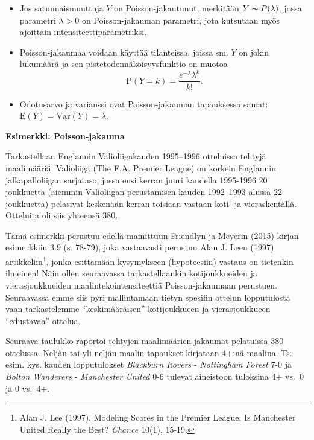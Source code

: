 \documentclass[
]{book}
\begin{document}
\begin{itemize}
\item
  Jos satunnaismuuttuja \(Y\) on Poisson-jakautunut, merkitään \(Y \thicksim P(\lambda)\), jossa parametri \(\lambda > 0\) on Poisson-jakauman parametri, jota kutsutaan myös ajoittain intensiteettiparametriksi.
\item
  Poisson-jakaumaa voidaan käyttää tilanteissa, joissa sm. \(Y\) on jokin lukumäärä ja sen pistetodennäköisyysfunktio on muotoa
  \[
  \text{P}(Y=k) = \frac{e^{-\lambda} \lambda^k}{k!}.
  \]
\item
  Odotusarvo ja varianssi ovat Poisson-jakauman tapauksessa samat: \(\text{E}(Y) = \mathrm{Var}(Y) = \lambda\).
\end{itemize}

\begin{eblock}{}
\textbf{Esimerkki: Poisson-jakauma}

Tarkastellaan Englannin Valioliigakauden 1995--1996 otteluissa tehtyjä maalimääriä. Valioliiga (The F.A. Premier League) on korkein Englannin jalkapalloliigan sarjataso, jossa ensi kerran juuri kaudella 1995-1996 20 joukkuetta (aiemmin Valioliigan perustamisen kauden 1992--1993 alussa 22 joukkuetta) pelasivat keskenään kerran toisiaan vastaan koti- ja vieraskentällä. Otteluita oli siis yhteensä 380.

Tämä esimerkki perustuu edellä mainittuun Friendlyn ja Meyerin (2015) kirjan esimerkkiin 3.9 (s. 78-79), joka vastaavasti perustuu Alan J. Leen (1997) artikkeliin\footnote{Alan J. Lee (1997). Modeling Scores in the Premier League: Is Manchester United Really the Best? \emph{Chance} 10(1), 15-19.}, jonka esittämään kysymykseen (hypoteesiin) vastaus on tietenkin ilmeinen! Näin ollen seuraavassa tarkastellaankin kotijoukkueiden ja vierasjoukkueiden maalintekointensiteettiä Poisson-jakaumaan perustuen. Seuraavassa emme siis pyri mallintamaan tietyn spesifin ottelun lopputulosta vaan tarkastelemme ``keskimääräisen'' kotijoukkueen ja vierasjoukkueen ``edustavaa'' ottelua.

Seuraava taulukko raportoi tehtyjen maalimäärien jakaumat pelatuissa 380 ottelussa. Neljän tai yli neljän maalin tapaukset kirjataan 4+:nä maalina. Ts. esim. kys. kauden lopputulokset \emph{Blackburn Rovers} - \emph{Nottingham Forest} 7-0 ja \emph{Bolton Wanderers} - \emph{Manchester United} 0-6 tulevat aineistoon tuloksina 4+ vs.~0 ja 0 vs.~4+.

\end{eblock}
\end{document}
